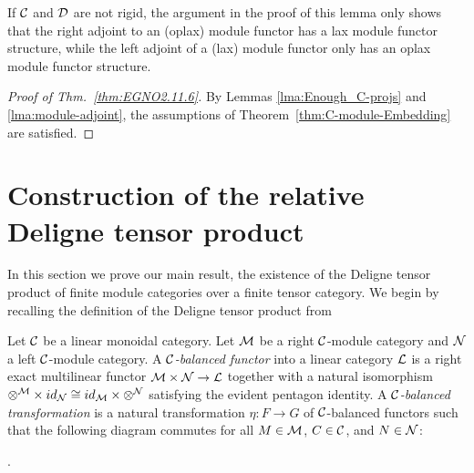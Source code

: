 \documentclass{amsart}
\begin{document}
\begin{remark}
If $\mathcal C$ and $\mathcal D$ are not rigid, the argument in the proof of this lemma only shows that the right adjoint to an (oplax) module functor has a lax module functor structure, while the left adjoint of a (lax) module functor only has an oplax module functor structure.  %
\end{remark}

\begin{proof}[Proof of Thm.~\ref{thm:EGNO2.11.6}]
By Lemmas \ref{lma:Enough_C-projs} and \ref{lma:module-adjoint}, the assumptions of Theorem~\ref{thm:C-module-Embedding} are satisfied.
\end{proof}


\section{Construction of the relative Deligne tensor product} \label{sec:tc-deligne}

In this section we prove our main result, the existence of the Deligne tensor product of finite module categories over a finite tensor category.  We begin by recalling the definition of the Deligne tensor product from \cite{0909.3140}


\begin{definition}
	Let $\mathcal C$ be a linear monoidal category. 
	Let $\mathcal M$ be a right $\mathcal C$-module category and $\mathcal N$ a left $\mathcal C$-module category. A {\em $\mathcal C$-balanced functor} into a linear category $\mathcal L$ is a right exact multilinear functor $\mathcal M \times \mathcal N \to \mathcal L$ together with a natural isomorphism $\otimes^{\mathcal M} \times id_{\mathcal N} \cong id_{\mathcal M} \times \otimes^{\mathcal N}$ satisfying the evident pentagon identity. A {\em $\mathcal C$-balanced transformation} is a natural transformation $\eta:F \to G$ of $\mathcal C$-balanced functors such that the following diagram commutes for all $M \in \mathcal M$, $C \in \mathcal C$, and $N \in \mathcal N$:
\begin{center}
.
\end{center}
\end{definition}
\end{document}
